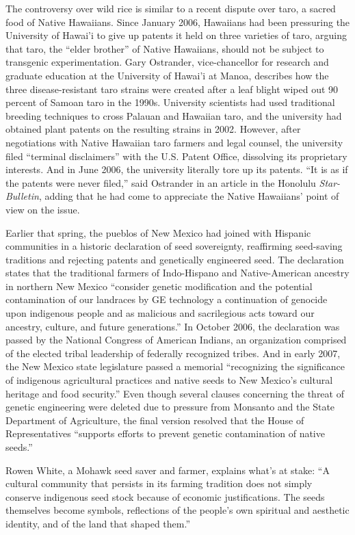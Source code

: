 The controversy over wild rice is similar to a recent dispute over taro,
a sacred food of Native Hawaiians. Since January 2006, Hawaiians had
been pressuring the University of Hawai'i to give up patents it held on
three varieties of taro, arguing that taro, the ``elder brother'' of
Native Hawaiians, should not be subject to transgenic experimentation.
Gary Ostrander, vice-chancellor for research and graduate education at
the University of Hawai'i at Manoa, describes how the three
disease-resistant taro strains were created after a leaf blight wiped
out 90 percent of Samoan taro in the 1990s. University scientists had
used traditional breeding techniques to cross Palauan and Hawaiian taro,
and the university had obtained plant patents on the resulting strains
in 2002. However, after negotiations with Native Hawaiian taro farmers
and legal counsel, the university filed ``terminal disclaimers'' with
the U.S. Patent Office, dissolving its proprietary interests. And in
June 2006, the university literally tore up its patents. ``It is as if
the patents were never filed,'' said Ostrander in an article in the
Honolulu \emph{Star-Bulletin}, adding that he had come to appreciate the
Native Hawaiians' point of view on the issue.

Earlier that spring, the pueblos of New Mexico had joined with Hispanic
communities in a historic declaration of seed sovereignty, reaffirming
seed-saving traditions and rejecting patents and genetically engineered
seed. The declaration states that the traditional farmers of
Indo-Hispano and Native-American ancestry in northern New Mexico
``consider genetic modification and the potential contamination of our
landraces by GE technology a continuation of genocide upon indigenous
people and as malicious and sacrilegious acts toward our ancestry,
culture, and future generations.'' In October 2006, the declaration was
passed by the National Congress of American Indians, an organization
comprised of the elected tribal leadership of federally recognized
tribes. And in early 2007, the New Mexico state legislature passed a
memorial ``recognizing the significance of indigenous agricultural
practices and native seeds to New Mexico's cultural heritage and food
security.'' Even though several clauses concerning the threat of genetic
engineering were deleted due to pressure from Monsanto and the State
Department of Agriculture, the final version resolved that the House of
Representatives ``supports efforts to prevent genetic contamination of
native seeds.''

Rowen White, a Mohawk seed saver and farmer, explains what's at stake:
``A cultural community that persists in its farming tradition does not
simply conserve indigenous seed stock because of economic
justifications. The seeds themselves become symbols, reflections of the
people's own spiritual and aesthetic identity, and of the land that
shaped them.''

